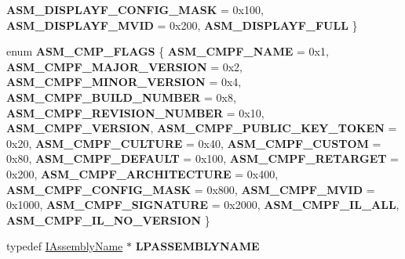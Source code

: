 \begin{DoxyCompactItemize}
{\bfseries A\+S\+M\+\_\+\+D\+I\+S\+P\+L\+A\+Y\+F\+\_\+\+C\+O\+N\+F\+I\+G\+\_\+\+M\+A\+SK} = 0x100, 
{\bfseries A\+S\+M\+\_\+\+D\+I\+S\+P\+L\+A\+Y\+F\+\_\+\+M\+V\+ID} = 0x200, 
{\bfseries A\+S\+M\+\_\+\+D\+I\+S\+P\+L\+A\+Y\+F\+\_\+\+F\+U\+LL}
 \}
\item 
\mbox{\label{interface_i_assembly_name_a9a523f70724902df8a63708cd0f54d6a}} 
enum {\bfseries A\+S\+M\+\_\+\+C\+M\+P\+\_\+\+F\+L\+A\+GS} \{ \newline
{\bfseries A\+S\+M\+\_\+\+C\+M\+P\+F\+\_\+\+N\+A\+ME} = 0x1, 
{\bfseries A\+S\+M\+\_\+\+C\+M\+P\+F\+\_\+\+M\+A\+J\+O\+R\+\_\+\+V\+E\+R\+S\+I\+ON} = 0x2, 
{\bfseries A\+S\+M\+\_\+\+C\+M\+P\+F\+\_\+\+M\+I\+N\+O\+R\+\_\+\+V\+E\+R\+S\+I\+ON} = 0x4, 
{\bfseries A\+S\+M\+\_\+\+C\+M\+P\+F\+\_\+\+B\+U\+I\+L\+D\+\_\+\+N\+U\+M\+B\+ER} = 0x8, 
\newline
{\bfseries A\+S\+M\+\_\+\+C\+M\+P\+F\+\_\+\+R\+E\+V\+I\+S\+I\+O\+N\+\_\+\+N\+U\+M\+B\+ER} = 0x10, 
{\bfseries A\+S\+M\+\_\+\+C\+M\+P\+F\+\_\+\+V\+E\+R\+S\+I\+ON}, 
{\bfseries A\+S\+M\+\_\+\+C\+M\+P\+F\+\_\+\+P\+U\+B\+L\+I\+C\+\_\+\+K\+E\+Y\+\_\+\+T\+O\+K\+EN} = 0x20, 
{\bfseries A\+S\+M\+\_\+\+C\+M\+P\+F\+\_\+\+C\+U\+L\+T\+U\+RE} = 0x40, 
\newline
{\bfseries A\+S\+M\+\_\+\+C\+M\+P\+F\+\_\+\+C\+U\+S\+T\+OM} = 0x80, 
{\bfseries A\+S\+M\+\_\+\+C\+M\+P\+F\+\_\+\+D\+E\+F\+A\+U\+LT} = 0x100, 
{\bfseries A\+S\+M\+\_\+\+C\+M\+P\+F\+\_\+\+R\+E\+T\+A\+R\+G\+ET} = 0x200, 
{\bfseries A\+S\+M\+\_\+\+C\+M\+P\+F\+\_\+\+A\+R\+C\+H\+I\+T\+E\+C\+T\+U\+RE} = 0x400, 
\newline
{\bfseries A\+S\+M\+\_\+\+C\+M\+P\+F\+\_\+\+C\+O\+N\+F\+I\+G\+\_\+\+M\+A\+SK} = 0x800, 
{\bfseries A\+S\+M\+\_\+\+C\+M\+P\+F\+\_\+\+M\+V\+ID} = 0x1000, 
{\bfseries A\+S\+M\+\_\+\+C\+M\+P\+F\+\_\+\+S\+I\+G\+N\+A\+T\+U\+RE} = 0x2000, 
{\bfseries A\+S\+M\+\_\+\+C\+M\+P\+F\+\_\+\+I\+L\+\_\+\+A\+LL}, 
\newline
{\bfseries A\+S\+M\+\_\+\+C\+M\+P\+F\+\_\+\+I\+L\+\_\+\+N\+O\+\_\+\+V\+E\+R\+S\+I\+ON}
 \}
\item 
\mbox{\label{interface_i_assembly_name_a75f8d6c169bc3967a56f74b5e85ba674}} 
typedef \hyperlink{interface_i_assembly_name}{I\+Assembly\+Name} $\ast$ {\bfseries L\+P\+A\+S\+S\+E\+M\+B\+L\+Y\+N\+A\+ME}
\end{DoxyCompactItemize}

